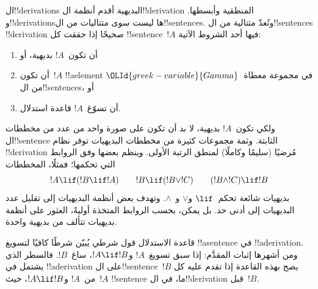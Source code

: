 \documentclass[../../../include/open-logic-section]{subfiles}
\begin{document}
      {}
      {}


ال!!{derivation}s البديهية أقدم أنظمة ال!!{derivation} المنطقية
وأبسطها. و!!{derivation}sها ليست سوى متتاليات من ال!!{sentence}s.
وتُعدّ متتالية من ال!!{sentence}s !!{derivation} صحيحًا إذا حققت كل
!!{sentence}~$!A$ فيها أحد الشروط الآتية:
\begin{enumerate}
\item أن تكون~$!A$ بديهية، أو
\item أن تكون~$!A$ !!a{element} في مجموعة معطاة~$\OLId{greek-variable}{Gamma}$ من
  ال!!{sentence}s، أو
\item أن تسوّغ~$!A$ قاعدة استدلال.
\end{enumerate}
ولكي تكون~$!A$ بديهية، لا بد أن تكون على صورة واحد من عدد من مخططات
ال!!{sentence} الثابتة. وثمة مجموعات كثيرة من مخططات البديهيات توفر
نظام !!{derivation} مُرضيًا (سليمًا وكاملًا) لمنطق الرتبة الأولى.
وينظم بعضها وفق الروابط التي تحكمها؛ فمثلًا، المخططات
\[
!A \lif (!B \lif !A) \qquad !B \lif (!B \lor !C) \qquad (!B \land !C) \lif !B
\]
بديهيات شائعة تحكم~$\lif$ و$\lor$ و~$\land$. وتهدف بعض أنظمة
البديهيات إلى تقليل عدد البديهيات إلى أدنى حد. بل يمكن، بحسب الروابط
المتخذة أوليةً، العثور على أنظمة بديهيات تتألف من بديهية واحدة.

قاعدة الاستدلال قول شرطي يُبيّن شرطًا كافيًا لتسويغ
!!a{sentence} في !!a{derivation}. ومن أشهرها إثبات المقدَّم:
إذا سبق تسويغ~$!A$ و$!A \lif !B$، ساغ~$!B$.
فالسطر الذي يشتمل في !!a{derivation} على ال!!{sentence}~$!B$
يصح بهذه القاعدة إذا تقدم عليه كل من~$!A$ و$!A \lif !B$،
حيث~$!A$ !!{sentence} ما، في ال!!{derivation} قبل~$!B$.
\end{document}
